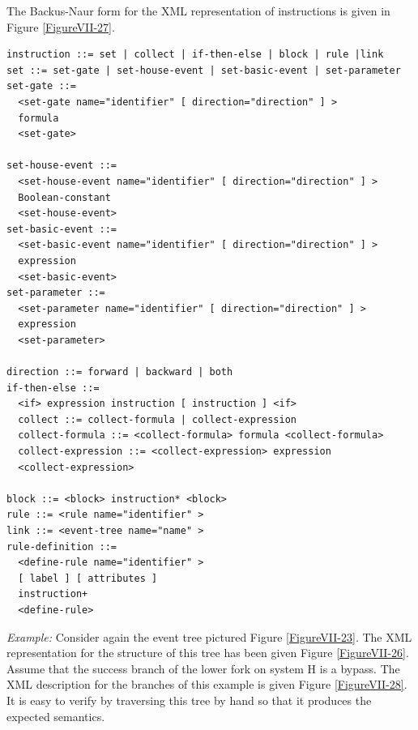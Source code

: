 \documentclass[11pt]{article}
\begin{document}
The Backus-Naur form for the XML representation of instructions is given in Figure \ref{FigureVII-27}.

\lstset{language=[LaTeX]TeX,label= ,caption= ,captionpos=b,numbers=none}
\begin{lstlisting}
instruction ::= set | collect | if-then-else | block | rule |link
set ::= set-gate | set-house-event | set-basic-event | set-parameter
set-gate ::=
  <set-gate name="identifier" [ direction="direction" ] >
  formula
  <set-gate>

set-house-event ::=
  <set-house-event name="identifier" [ direction="direction" ] >
  Boolean-constant
  <set-house-event>
set-basic-event ::=
  <set-basic-event name="identifier" [ direction="direction" ] >
  expression
  <set-basic-event>
set-parameter ::=
  <set-parameter name="identifier" [ direction="direction" ] >
  expression
  <set-parameter>

direction ::= forward | backward | both
if-then-else ::=
  <if> expression instruction [ instruction ] <if>
  collect ::= collect-formula | collect-expression
  collect-formula ::= <collect-formula> formula <collect-formula>
  collect-expression ::= <collect-expression> expression
  <collect-expression>

block ::= <block> instruction* <block>
rule ::= <rule name="identifier" >
link ::= <event-tree name="name" >
rule-definition ::=
  <define-rule name="identifier" >
  [ label ] [ attributes ]
  instruction+
  <define-rule>
\end{lstlisting}

\emph{Example:} Consider again the event tree pictured Figure \ref{FigureVII-23}. The
XML representation for the structure of this tree has been given Figure
\ref{FigureVII-26}. Assume that the success branch of the lower fork on system H is
a bypass. The XML description for the branches of this example is given
Figure \ref{FigureVII-28}. It is easy to verify by traversing this tree by hand so
that it produces the expected semantics.
\end{document}
